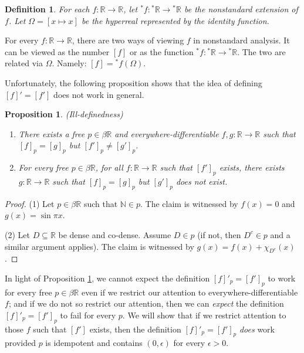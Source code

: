 \documentclass[microtype]{jloganal}
\newtheorem{proposition}[theorem]{Proposition}
\newtheorem{definition}[theorem]{Definition}
\begin{document}
\begin{definition}
    For each $f:\mathbb R\to\mathbb R$, let ${}^*f:{}^*\mathbb R\to{}^*\mathbb R$
    be the nonstandard extension of $f$. Let $\Omega=[x\mapsto x]$ be
    the hyperreal represented by the identity function.
\end{definition}

For every $f:\mathbb R\to\mathbb R$, there are two ways of viewing $f$
in nonstandard analysis. It can be viewed as the number $[f]$ or as the
function ${}^*f:{}^*\mathbb R\to{}^*\mathbb R$. The two are related via
$\Omega$. Namely: $[f]={}^*f(\Omega)$.

Unfortunately, the following proposition shows that the idea of defining
$[f]'=[f']$ does not work in general.

\begin{proposition}
\label{illdefdprop}
    (Ill-definedness)
    \begin{enumerate}
        \item
        There exists a free $p\in\beta\mathbb R$
        and everywhere-differentiable $f,g:\mathbb R\to\mathbb R$
        such that $[f]_p=[g]_p$ but $[f']_p\not=[g']_p$.
        \item
        For every free $p\in\beta\mathbb R$,
        for all $f:\mathbb R\to\mathbb R$ such that $[f']_p$ exists,
        there exists $g:\mathbb R\to\mathbb R$ such that $[f]_p=[g]_p$
        but $[g']_p$ does not exist.
    \end{enumerate}
\end{proposition}

\begin{proof}
    (1) Let $p\in\beta\mathbb R$ such that
    $\mathbb N\in p$. The claim is witnessed by $f(x)=0$
    and $g(x)=\sin \pi x$.

    (2) Let $D\subseteq \mathbb R$ be dense and co-dense.
    Assume $D\in p$ (if not, then $D^c\in p$ and a similar argument applies).
    The claim is witnessed by $g(x)=f(x)+\chi_{D^c}(x)$.
\end{proof}

In light of Proposition \ref{illdefdprop}, we cannot expect the definition
$[f]'_p=[f']_p$ to work for every free $p\in\beta\mathbb R$ even
if we restrict our attention to everywhere-differentiable $f$; and if we
do not so restrict our attention, then we can \emph{expect} the definition
$[f]'_p=[f']_p$ to fail for every $p$.
We will show that if we restrict attention to those $f$ such that $[f']$
exists, then the definition $[f]'_p=[f']_p$ \emph{does} work provided
$p$ is idempotent and contains $(0,\epsilon)$ for every $\epsilon>0$.
\end{document}
